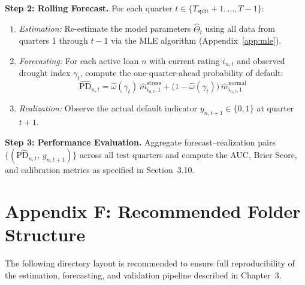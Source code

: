 \documentclass[12pt,a4paper]{article}
\begin{document}
\textbf{Step 2: Rolling Forecast.} For each quarter $t \in \{T_{\text{split}}+1, \ldots, T-1\}$:
\begin{enumerate}[noitemsep]
    \item \textit{Estimation:} Re-estimate the model parameters $\hat{\Theta}_t$ using all data from quarters 1 through $t-1$ via the MLE algorithm (Appendix~\ref{app:mle}).
    \item \textit{Forecasting:} For each active loan $n$ with current rating $i_{n,t}$ and observed drought index $\gamma_t$, compute the one-quarter-ahead probability of default:
    \begin{equation}
    \widehat{\text{PD}}_{n,t} = \hat{\omega}(\gamma_t)\, \hat{m}_{i_{n,t},1}^{\text{stress}} + \bigl(1 - \hat{\omega}(\gamma_t)\bigr)\, \hat{m}_{i_{n,t},1}^{\text{normal}}
    \end{equation}
    \item \textit{Realization:} Observe the actual default indicator $y_{n,t+1} \in \{0, 1\}$ at quarter $t+1$.
\end{enumerate}

\textbf{Step 3: Performance Evaluation.} Aggregate forecast--realization pairs $\{(\widehat{\text{PD}}_{n,t},\, y_{n,t+1})\}$ across all test quarters and compute the AUC, Brier Score, and calibration metrics as specified in Section~3.10.

\newpage

\section*{Appendix F: Recommended Folder Structure}\label{app:folder}

The following directory layout is recommended to ensure full reproducibility of the estimation, forecasting, and validation pipeline described in Chapter~3.
\end{document}
